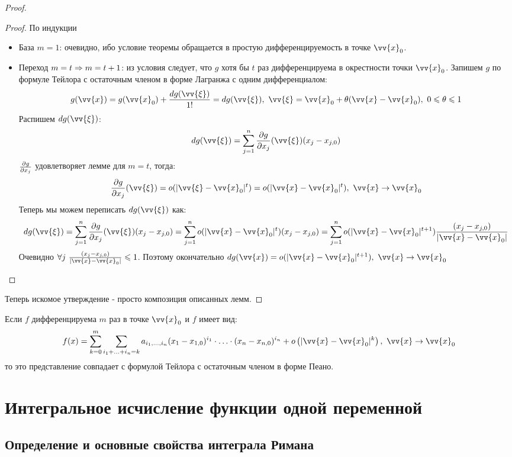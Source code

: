 \begin{proof}
	\begin{proof}
		По индукции
		\begin{itemize}
			\item База $m = 1$: очевидно, ибо условие теоремы обращается в простую дифференцируемость в точке $\vv{x}_0$.
			
			\item Переход $m = t \Rightarrow m = t + 1$: из условия следует, что $g$ хотя бы $t$ раз дифференцируема в окрестности точки $\vv{x}_0$. Запишем $g$ по формуле Тейлора с остаточным членом в форме Лагранжа с одним дифференциалом:
			\[
				g(\vv{x}) = g(\vv{x}_0) + \frac{dg(\vv{\xi})}{1!} = dg(\vv{\xi}),\ \vv{\xi} = \vv{x}_0 + \theta(\vv{x} - \vv{x}_0),\ 0 \le \theta \le 1
			\]
			Распишем $dg(\vv{\xi})$:
			\[
				dg(\vv{\xi}) = \suml_{j = 1}^n \pd{g}{x_j} (\vv{\xi}) (x_j - x_{j, 0})
			\]
			$\frac{\partial g}{\partial x_j}$ удовлетворяет лемме для $m = t$, тогда:
			\[
				\pd{g}{x_j}(\vv{\xi}) = o(|\vv{\xi} - \vv{x}_0|^t) = o(|\vv{x} - \vv{x}_0|^t),\ \vv{x} \to \vv{x}_0
			\]
			Теперь мы можем переписать $dg(\vv{\xi})$ как:
			\[
				dg(\vv{\xi}) = \suml_{j = 1}^n \pd{g}{x_j}(\vv{\xi})(x_j - x_{j, 0}) = \suml_{j = 1}^n o(|\vv{x} - \vv{x}_0|^t)(x_j - x_{j, 0}) = \suml_{j = 1}^n o(|\vv{x} - \vv{x}_0|^{t + 1})\frac{(x_j - x_{j, 0})}{|\vv{x} - \vv{x}_0|}
			\]
			Очевидно $\forall j\ \frac{(x_j - x_{j, 0})}{|\vv{x} - \vv{x}_0|} \leq 1$. Поэтому окончательно $dg(\vv{x}) = o(|\vv{x} - \vv{x}_0|^{t + 1}),\ \vv{x} \to \vv{x}_0$
		\end{itemize}
	\end{proof}
	Теперь искомое утверждение - просто композиция описанных лемм.
\end{proof}

\begin{note}
	Если $f$ дифференцируема $m$ раз в точке $\vv{x}_0$ и $f$ имеет вид:
	\[
		f(x) = \suml_{k = 0}^m \suml_{i_1 + \ldots + i_n = k} a_{i_1, \ldots, i_n} (x_1 - x_{1, 0})^{i_1} \cdot \ldots \cdot (x_n - x_{n, 0})^{i_n} + o\left(|\vv{x} - \vv{x}_0|^k\right),\ \vv{x} \to \vv{x}_0
	\]
	то это представление совпадает с формулой Тейлора с остаточным членом в форме Пеано.
\end{note}

\section{Интегральное исчисление функции одной переменной}

\subsection{Определение и основные свойства интеграла Римана}

